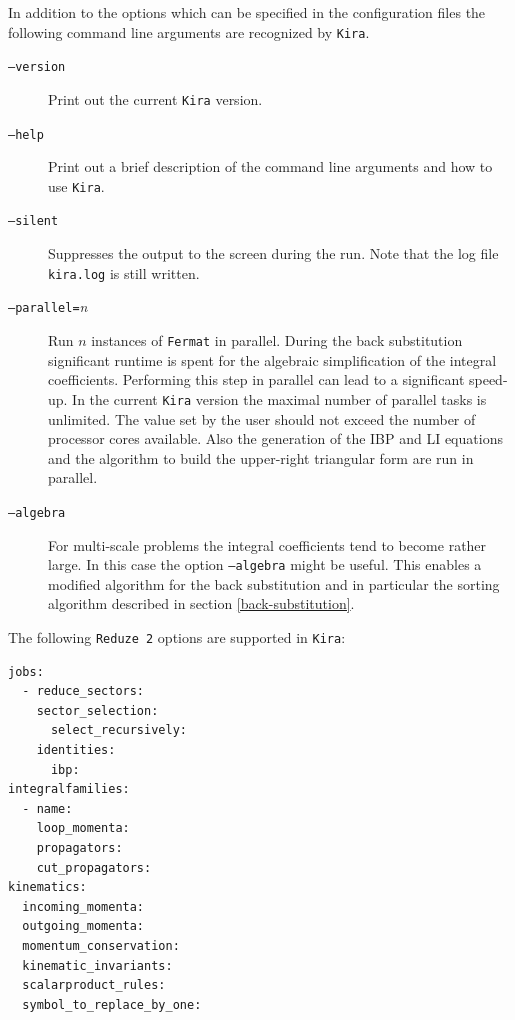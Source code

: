 \documentclass[a4paper,12pt]{scrartcl}
\newcommand*{\kira}{\texttt{Kira}}
\newcommand*{\reduzetwo}{\texttt{Reduze\,2}}
\newcommand*{\fermat}{\texttt{Fermat}}
\begin{document}
In addition to the options which can be specified in the configuration
files the following command line arguments are recognized by \kira{}.
\begin{description}
\item[\texttt{--version}] Print out the current \kira{} version.
\item[\texttt{--help}] Print out a brief description of the command
  line arguments and how to use \kira{}.
\item[\texttt{--silent}] Suppresses the output to the
  screen during the run. Note that the log file \texttt{kira.log} is still written.
\item[\texttt{--parallel=}\textit{n}] Run
  $n$ instances of \fermat{} in parallel. During the back
  substitution significant runtime is spent for the algebraic
  simplification of the integral coefficients. Performing this step in
  parallel can lead to a significant speed-up. In the current \kira{}
  version the maximal number of parallel tasks is unlimited. The
  value set by the user should not exceed the number of processor
  cores available. Also the generation of the
  IBP and LI equations and the algorithm to build the
  upper-right triangular form are run in parallel.
\item[\texttt{--algebra}] For multi-scale problems the integral
  coefficients tend to become rather large. In this case the option
  \texttt{--algebra} might be useful. This enables a
  modified algorithm for the back substitution and in particular the
  sorting algorithm described in section \ref{back-substitution}.
\end{description}

The following \reduzetwo{} options are supported in \kira{}:
\begin{verbatim}
jobs:
  - reduce_sectors:
    sector_selection:
      select_recursively:
    identities:
      ibp:
integralfamilies:
  - name:
    loop_momenta:
    propagators:
    cut_propagators:
kinematics:
  incoming_momenta:
  outgoing_momenta:
  momentum_conservation:
  kinematic_invariants:
  scalarproduct_rules:
  symbol_to_replace_by_one:
\end{verbatim}
\end{document}
